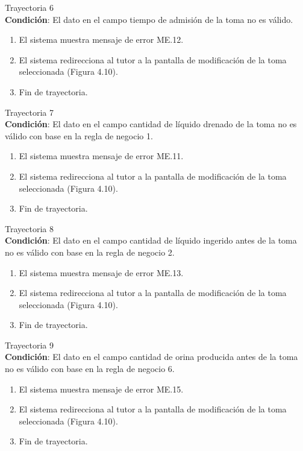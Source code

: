 \large{Trayectoria 6}\\
\textbf{Condición}: El dato en el campo tiempo de admisión de la toma no es válido.
\begin{enumerate}
\item El sistema muestra mensaje de error ME.12.
\item El sistema redirecciona al tutor a la pantalla de modificación de la toma seleccionada (Figura 4.10).
\item Fin de trayectoria.
\end{enumerate}
\large{Trayectoria 7}\\
\textbf{Condición}: El dato en el campo cantidad de líquido drenado de la toma no es válido con base en la regla de negocio 1.
\begin{enumerate}
\item El sistema muestra mensaje de error ME.11.
\item El sistema redirecciona al tutor a la pantalla de modificación de la toma seleccionada (Figura 4.10).
\item Fin de trayectoria.
\end{enumerate}
\large{Trayectoria 8}\\
\textbf{Condición}: El dato en el campo cantidad de líquido ingerido antes de la toma no es válido con base en la regla de negocio 2.
\begin{enumerate}
\item El sistema muestra mensaje de error ME.13.
\item El sistema redirecciona al tutor a la pantalla de modificación de la toma seleccionada (Figura 4.10).
\item Fin de trayectoria.
\end{enumerate}
\large{Trayectoria 9}\\
\textbf{Condición}: El dato en el campo cantidad de orina producida antes de la toma no es válido con base en la regla de negocio 6.
\begin{enumerate}
\item El sistema muestra mensaje de error ME.15.
\item El sistema redirecciona al tutor a la pantalla de modificación de la toma seleccionada (Figura 4.10).
\item Fin de trayectoria.
\end{enumerate}
\newpage
